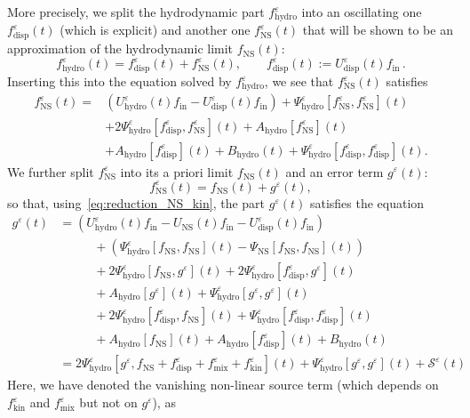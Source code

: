 \documentclass[10pt]{amsart}
\theoremstyle{definition}\newtheorem{defi}[theo]{Definition}\newtheorem{rema}[theo]{Remark}\newtheorem{exam}[theo]{Example}\newtheorem{exem}[theo]{Example}\newtheorem{nota}[theo]{Notation}
\newcommand{\ini}{\mathrm{in}}
\newcommand{\ns}{\mathrm{NS}}
\newcommand{\hyd}{\mathrm{hydro}}
\newcommand{\mix}{\mathrm{mix}}
\newcommand{\kin}{\mathrm{kin}}
\newcommand{\disp}{\mathrm{disp}}
\renewcommand{\SS}{\mathcal{S}}
\newcommand*\eps{{\varepsilon}}
\begin{document}
More precisely, we split the hydrodynamic part $f^\eps_\hyd$ into an oscillating one $f^\eps_\disp(t)$ (which is explicit) and another one $f^\eps_\ns(t)$ that will be shown to be an approximation of the hydrodynamic limit $f_\ns(t)$:
\begin{equation}\label{eq:fepshyd}
f^\eps_\hyd(t) = f^\eps_\disp(t) + f^\eps_\ns(t), \qquad f^\eps_\disp(t) := U^\eps_\disp(t) f_{\ini}\,.
\end{equation}
Inserting this into the equation solved by $f^\eps_\hyd$, we see that $f^\eps_\ns(t)$ satisfies
\begingroup
\allowdisplaybreaks
\begin{align*}
f^\eps_\ns(t) =& \left(U^\eps_\hyd(t)f_\ini - U^\eps_\disp(t)f_\ini\right) + \Psi^\eps_\hyd\left[f^\eps_\ns, f^\eps_\ns \right](t)\\
&+ 2 \Psi^\eps_\hyd\left[f^\eps_\disp, f^\eps_\ns\right](t) + A_\hyd\left[f^\eps_\ns\right](t)\\
&+ A_\hyd\left[f^\eps_\disp\right](t) + B_\hyd(t) + \Psi^\eps_\hyd\left[f_\disp^\eps, f_\disp^\eps \right](t).
\end{align*}
\endgroup
We further split $f^\eps_\ns$ into its a priori limit $f_\ns(t)$ and an error term $g^\eps(t)$:
\[
f^\eps_\ns(t) = f_\ns(t) + g^\eps(t),
\]
so that, using~\eqref{eq:reduction_NS_kin}, the part $g^\eps(t)$ satisfies the equation
\begin{align*}
g^\eps(t) &= \left(U^\eps_\hyd(t)f_{\ini} - U_\ns(t)f_{\ini} - U^\eps_\disp(t)f_\ini\right)\\
&\phantom{+++} + \left(\Psi^\eps_\hyd\left[f_\ns, f_\ns \right](t) - \Psi_\ns\left[f_\ns, f_\ns \right](t)\right)
\\
&\phantom{+++} + 2 \Psi^\eps_\hyd\left[f_\ns, g^\eps \right](t) + 2 \Psi^\eps_\hyd\left[f^\eps_\disp, g^\eps \right](t)\\
&\phantom{+++} + A_\hyd\left[g^\eps\right](t) + \Psi^\eps_\hyd\left[g^\eps, g^\eps\right](t) \\
&\phantom{+++} + 2 \Psi^\eps_\hyd\left[f^\eps_\disp, f_\ns \right](t) + \Psi^\eps_\hyd\left[f^\eps_\disp, f^\eps_\disp\right](t) \\
&\phantom{+++} + A_\hyd\left[f_\ns\right](t) + A_\hyd\left[f^\eps_\disp\right](t) + B_\hyd(t) \\
&=2 \Psi^\eps_\hyd\left[g^\eps, f_\ns + f^\eps_\disp + f^\eps_\mix + f^\eps_\kin\right](t) + \Psi^\eps_\hyd\left[g^\eps, g^\eps\right](t) + \SS^\eps(t)
\end{align*}
Here, we have denoted the vanishing non-linear source term (which depends on $f^\eps_\kin$ and $f^\eps_\mix$ but not on $g^\eps$), as
\end{document}
